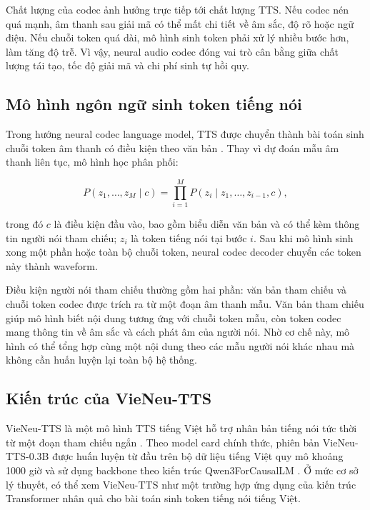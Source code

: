 \documentclass[a4paper,13pt,twoside]{report}
\begin{document}
Chất lượng của codec ảnh hưởng trực tiếp tới chất lượng TTS. Nếu codec nén quá mạnh, âm thanh sau giải mã có thể mất chi tiết về âm sắc, độ rõ hoặc ngữ điệu. Nếu chuỗi token quá dài, mô hình sinh token phải xử lý nhiều bước hơn, làm tăng độ trễ. Vì vậy, neural audio codec đóng vai trò cân bằng giữa chất lượng tái tạo, tốc độ giải mã và chi phí sinh tự hồi quy.

\subsection{Mô hình ngôn ngữ sinh token tiếng nói}

Trong hướng neural codec language model, TTS được chuyển thành bài toán sinh chuỗi token âm thanh có điều kiện theo văn bản \cite{valle}. Thay vì dự đoán mẫu âm thanh liên tục, mô hình học phân phối:

\begin{equation}
    P(z_1,\ldots,z_M \mid c)
    =
    \prod_{i=1}^{M}
    P(z_i \mid z_1,\ldots,z_{i-1},c),
\end{equation}

trong đó \(c\) là điều kiện đầu vào, bao gồm biểu diễn văn bản và có thể kèm thông tin người nói tham chiếu; \(z_i\) là token tiếng nói tại bước \(i\). Sau khi mô hình sinh xong một phần hoặc toàn bộ chuỗi token, neural codec decoder chuyển các token này thành waveform.

Điều kiện người nói tham chiếu thường gồm hai phần: văn bản tham chiếu và chuỗi token codec được trích ra từ một đoạn âm thanh mẫu. Văn bản tham chiếu giúp mô hình biết nội dung tương ứng với chuỗi token mẫu, còn token codec mang thông tin về âm sắc và cách phát âm của người nói. Nhờ cơ chế này, mô hình có thể tổng hợp cùng một nội dung theo các mẫu người nói khác nhau mà không cần huấn luyện lại toàn bộ hệ thống.

\subsection{Kiến trúc của VieNeu-TTS}

VieNeu-TTS là một mô hình TTS tiếng Việt hỗ trợ nhân bản tiếng nói tức thời từ một đoạn tham chiếu ngắn \cite{vieneutts}. Theo model card chính thức, phiên bản VieNeu-TTS-0.3B được huấn luyện từ đầu trên bộ dữ liệu tiếng Việt quy mô khoảng 1000 giờ và sử dụng backbone theo kiến trúc Qwen3ForCausalLM \cite{vieneutts03b}. Ở mức cơ sở lý thuyết, có thể xem VieNeu-TTS như một trường hợp ứng dụng của kiến trúc Transformer nhân quả cho bài toán sinh token tiếng nói tiếng Việt.
\end{document}
